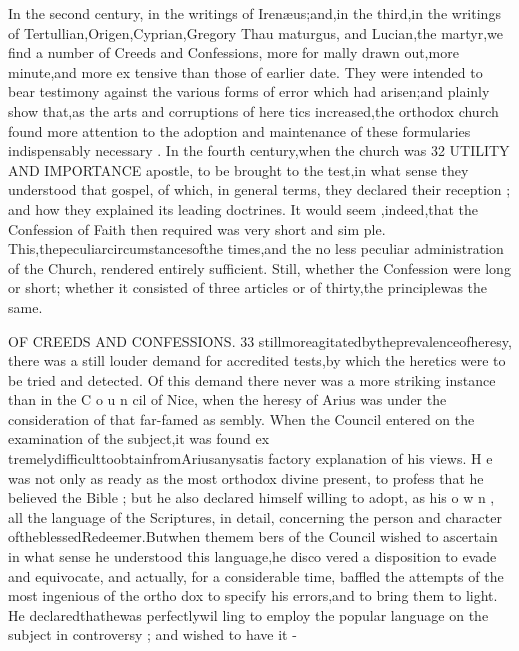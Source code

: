 \documentclass[
]{book}
\begin{document}
In the second century, in the writings of Irenæus;and,in the third,in the writings of Tertullian,Origen,Cyprian,Gregory Thau maturgus, and Lucian,the martyr,we find a number of Creeds and Confessions, more for mally drawn out,more minute,and more ex tensive than those of earlier date. They were intended to bear testimony against the various forms of error which had arisen;and plainly show that,as the arts and corruptions of here tics increased,the orthodox church found more attention to the adoption and maintenance of these formularies indispensably necessary .
In the fourth century,when the church was
32 UTILITY AND IMPORTANCE
apostle, to be brought to the test,in what sense they understood that gospel, of which, in
general terms, they declared their reception ;
and how they explained its leading doctrines. It would seem ,indeed,that the Confession of
Faith then required was very short and sim
ple. This,thepeculiarcircumstancesofthe
times,and the no less peculiar administration
of the Church, rendered entirely sufficient.
Still, whether the Confession were long or short; whether it consisted of three articles or
of thirty,the principlewas the same.

OF CREEDS AND CONFESSIONS. 33
stillmoreagitatedbytheprevalenceofheresy, there was a still louder demand for accredited
tests,by which the heretics were to be tried and detected. Of this demand there never
was a more striking instance than in the C o u n
cil of Nice, when the heresy of Arius was under the consideration of that far-famed as
sembly. When the Council entered on the examination of the subject,it was found ex
tremelydifficulttoobtainfromAriusanysatis
factory explanation of his views. H e was not only as ready as the most orthodox divine
present, to profess that he believed the Bible ; but he also declared himself willing to adopt,
as his o w n , all the language of the Scriptures, in detail, concerning the person and character oftheblessedRedeemer.Butwhen themem bers of the Council wished to ascertain in what
sense he understood this language,he disco vered a disposition to evade and equivocate, and actually, for a considerable time, baffled
the attempts of the most ingenious of the ortho dox to specify his errors,and to bring them to light. He declaredthathewas perfectlywil
ling to employ the popular language on the subject in controversy ; and wished to have it
-
\end{document}
